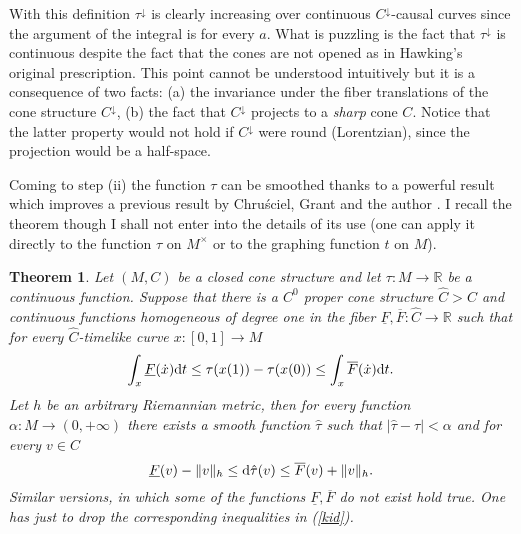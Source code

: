 \documentclass[a4paper]{jpconf}
\newtheorem{theorem}{Theorem}[section]
\theoremstyle{definition}
\theoremstyle{remark}
\newcommand{\dd}{{\rm d}}
\begin{document}
With this definition $\tau^\downarrow$ is clearly increasing over continuous $C^\downarrow$-causal curves since the  argument of the integral is for every $a$.
What is puzzling is the fact that $\tau^\downarrow$ is continuous despite the fact that the cones are not opened as in Hawking's original prescription. This point cannot be understood intuitively but it is a consequence of two facts: (a) the invariance under the fiber translations of the cone structure $C^\downarrow$, (b) the fact that $C^\downarrow$ projects to a {\em sharp} cone $C$. Notice that the latter property would not hold if $C^\downarrow$ were round (Lorentzian), since the projection would be a half-space.

 Coming to step (ii) the function $\tau$ can be smoothed thanks to a powerful result \cite{minguzzi17} which improves a previous result by Chru\'sciel, Grant and the author \cite[Th.\ 4.8]{chrusciel13}. I recall the theorem though I shall not enter into the details of its use (one can apply it directly to the function $\tau$ on $M^\times$ or to the graphing function $t$ on $M$).
\begin{theorem} \label{moz}
  Let $({ M},C)$ be a closed cone structure and
 let $\tau\colon M\to \mathbb{R}$ be a continuous function. Suppose that there is a $C^0$ proper cone structure $\hat C>C$ and continuous functions  homogeneous of degree one in the fiber $\underline F, \overline F\colon \hat C\to \mathbb{R}$ such that for every  $\hat C$-timelike  curve $x\colon [0,1]\to M$
 \begin{equation} \label{mos}
 \int_x \underline F(\dot x) \dd t\le \tau(x(1))-\tau(x(0))\le \int_x \overline F(\dot x) \dd t.
 \end{equation}
 Let $h$ be an arbitrary Riemannian metric, then for every function $\alpha\colon { M} \to (0,+\infty)$ there exists
a smooth  function $\hat{\tau}$ such that $\vert \hat\tau-\tau\vert <\alpha$ and for every $v\in C$
\begin{equation} \label{kid}
\underline F(v)- \Vert v\Vert_h \le \dd \hat \tau(v) \le \overline F(v)+ \Vert v\Vert_h .
\end{equation}
Similar versions, in which some of the functions $\underline F, \overline F$ do not exist hold true. One has just to drop the corresponding inequalities in (\ref{kid}).
\end{theorem}
\end{document}
